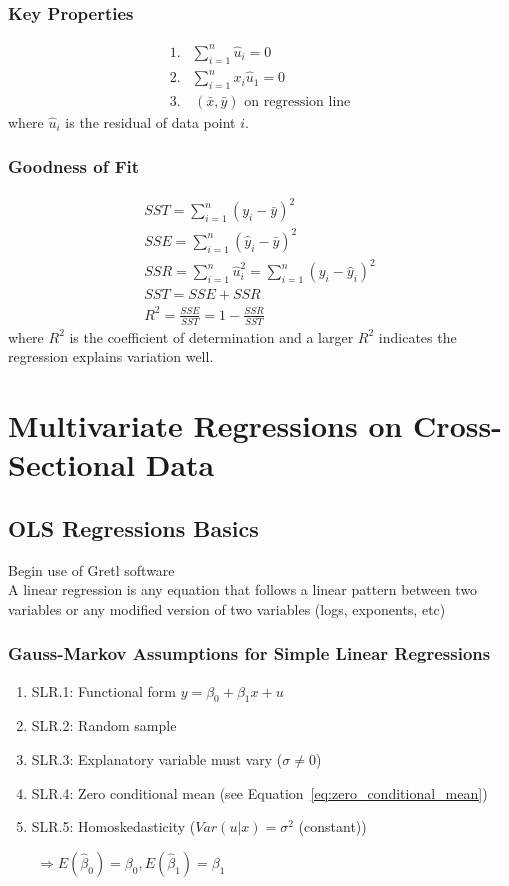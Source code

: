 \documentclass[12pt]{article}
\numberwithin{equation}{section}
\begin{document}
\subsubsection{Key Properties}
\label{sec:key_properties}
\begin{align}
    1.& \sum_{i=1}^{n} \hat{u}_i = 0 \\
    2.& \sum_{i=1}^{n} x_i \hat{u}_1 = 0 \\
    3.&\, (\bar{x},\bar{y}) \text{ on regression line}
\end{align}
where $\hat{u}_i$ is the residual of data point $i$.

\subsubsection{Goodness of Fit}
\label{sec:goodness_of_fit}
\begin{gather}
    SST = \sum_{i=1}^{n} (y_i-\bar{y})^2 \\
    SSE = \sum_{i=1}^{n} (\hat{y}_i-\bar{y})^2 \\
    SSR = \sum_{i=1}^{n} \hat{u}_i^2 = \sum_{i=1}^{n} (y_i-\hat{y}_i)^2 \\
    SST = SSE + SSR \\
    R^2 = \frac{SSE}{SST} = 1 - \frac{SSR}{SST}
\end{gather}
where $R^2$ is the coefficient of determination and a larger $R^2$ indicates the regression explains variation well.

\section{Multivariate Regressions on Cross-Sectional Data}

\subsection{OLS Regressions Basics}
Begin use of Gretl software \\[0.5cm]
A linear regression is any equation that follows a linear pattern between two variables or any modified version of two variables (logs, exponents, etc)

\subsubsection{Gauss-Markov Assumptions for Simple Linear Regressions}
\begin{enumerate}
    \item SLR.1: Functional form $y = \beta_0 + \beta_1 x + u$
    \item SLR.2: Random sample
    \item SLR.3: Explanatory variable must vary ($\sigma \neq 0$)
    \item SLR.4: Zero conditional mean (see Equation~\ref{eq:zero_conditional_mean})
    \item SLR.5: Homoskedasticity ($Var(u|x) = \sigma^2$ (constant))
\end{enumerate}
$\qquad \Rightarrow E(\hat{\beta}_0) = \beta_0, E(\hat{\beta}_1) = \beta_1$
\end{document}
